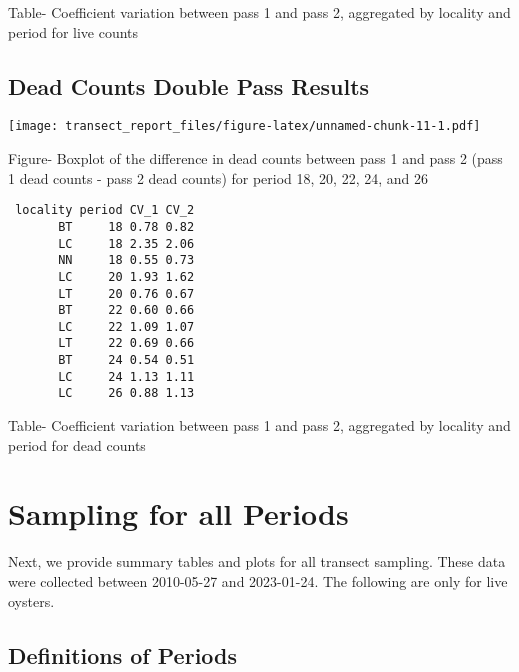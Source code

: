 \documentclass[
]{article}
\begin{document}
Table- Coefficient variation between pass 1 and pass 2, aggregated by
locality and period for live counts\\
\newpage

\hypertarget{dead-counts-double-pass-results}{%
\subsection{Dead Counts Double Pass
Results}\label{dead-counts-double-pass-results}}

\texttt{[image: transect\_report\_files/figure-latex/unnamed-chunk-11-1.pdf]}

Figure- Boxplot of the difference in dead counts between pass 1 and pass
2 (pass 1 dead counts - pass 2 dead counts) for period 18, 20, 22, 24,
and 26

\begin{verbatim}
 locality period CV_1 CV_2
       BT     18 0.78 0.82
       LC     18 2.35 2.06
       NN     18 0.55 0.73
       LC     20 1.93 1.62
       LT     20 0.76 0.67
       BT     22 0.60 0.66
       LC     22 1.09 1.07
       LT     22 0.69 0.66
       BT     24 0.54 0.51
       LC     24 1.13 1.11
       LC     26 0.88 1.13
\end{verbatim}

Table- Coefficient variation between pass 1 and pass 2, aggregated by
locality and period for dead counts

\hypertarget{sampling-for-all-periods}{%
\section{Sampling for all Periods}\label{sampling-for-all-periods}}

Next, we provide summary tables and plots for all transect sampling.
These data were collected between 2010-05-27 and 2023-01-24. The
following are only for live oysters.

\hypertarget{definitions-of-periods}{%
\subsection{Definitions of Periods}\label{definitions-of-periods}}

\begingroup\Large
\end{document}
